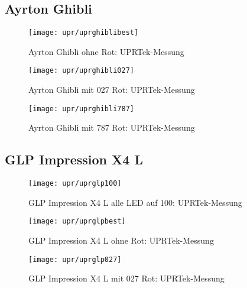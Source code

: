 \documentclass[pagesize,paper=A4,fontsize=12pt,utf8,numbers=noenddot,bibliography=totoc,listof=totoc,DIV=11,BCOR=1mm]{scrreprt}
\begin{document}
\subsection{Ayrton Ghibli}

\begin{figure}[htp]     %
\centering
\texttt{[image: upr/uprghiblibest]} 
\caption {Ayrton Ghibli ohne Rot: UPRTek-Messung} 
\end{figure}

\begin{figure}[htp]     %
\centering
\texttt{[image: upr/uprghibli027]} 
\caption {Ayrton Ghibli mit 027 Rot: UPRTek-Messung} 
\end{figure}

\begin{figure}[htp]     %
\centering
\texttt{[image: upr/uprghibli787]} 
\caption {Ayrton Ghibli mit 787 Rot: UPRTek-Messung} 
\end{figure}



\subsection{GLP Impression X4 L}

\begin{figure}[htp]     %
\centering
\texttt{[image: upr/uprglp100]} 
\caption {GLP Impression X4 L alle LED auf 100: UPRTek-Messung} 
\end{figure}

\begin{figure}[htp]     %
\centering
\texttt{[image: upr/uprglpbest]} 
\caption {GLP Impression X4 L ohne Rot: UPRTek-Messung} 
\end{figure}

\begin{figure}[htp]     %
\centering
\texttt{[image: upr/uprglp027]} 
\caption {GLP Impression X4 L mit 027 Rot: UPRTek-Messung} 
\end{figure}
\end{document}
